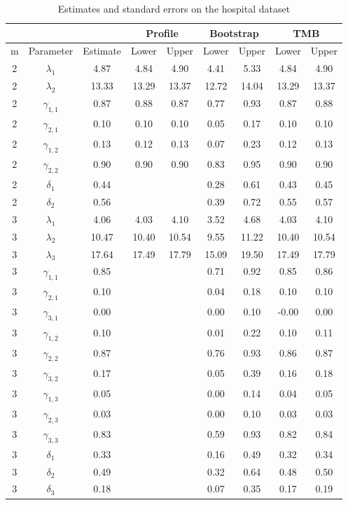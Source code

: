\documentclass[bimj,fleqn]{w-art}\usepackage[]{graphicx}\usepackage[]{color}
\theoremstyle{plain}
\theoremstyle{definition}
\begin{document}
\begin{table}[ht]
\centering
\begin{tabular}{ccccccccc}
  &&& \multicolumn{2}{c}{Profile}& \multicolumn{2}{c}{Bootstrap}& \multicolumn{2}{c}{TMB}\\ \hline
m & Parameter & Estimate & Lower & Upper & Lower & Upper & Lower & Upper \\ 
  \hline
  2 & $\lambda_{1}$ & 4.87 & 4.84 & 4.90 & 4.41 & 5.33 & 4.84 & 4.90 \\ 
    2 & $\lambda_{2}$ & 13.33 & 13.29 & 13.37 & 12.72 & 14.04 & 13.29 & 13.37 \\ 
    2 & $\gamma_{1, 1}$ & 0.87 & 0.88 & 0.87 & 0.77 & 0.93 & 0.87 & 0.88 \\ 
    2 & $\gamma_{2, 1}$ & 0.10 & 0.10 & 0.10 & 0.05 & 0.17 & 0.10 & 0.10 \\ 
    2 & $\gamma_{1, 2}$ & 0.13 & 0.12 & 0.13 & 0.07 & 0.23 & 0.12 & 0.13 \\ 
    2 & $\gamma_{2, 2}$ & 0.90 & 0.90 & 0.90 & 0.83 & 0.95 & 0.90 & 0.90 \\ 
    2 & $\delta_{1}$ & 0.44 &  &  & 0.28 & 0.61 & 0.43 & 0.45 \\ 
    2 & $\delta_{2}$ & 0.56 &  &  & 0.39 & 0.72 & 0.55 & 0.57 \\ 
    3 & $\lambda_{1}$ & 4.06 & 4.03 & 4.10 & 3.52 & 4.68 & 4.03 & 4.10 \\ 
    3 & $\lambda_{2}$ & 10.47 & 10.40 & 10.54 & 9.55 & 11.22 & 10.40 & 10.54 \\ 
    3 & $\lambda_{3}$ & 17.64 & 17.49 & 17.79 & 15.09 & 19.50 & 17.49 & 17.79 \\ 
    3 & $\gamma_{1, 1}$ & 0.85 &  &  & 0.71 & 0.92 & 0.85 & 0.86 \\ 
    3 & $\gamma_{2, 1}$ & 0.10 &  &  & 0.04 & 0.18 & 0.10 & 0.10 \\ 
    3 & $\gamma_{3, 1}$ & 0.00 &  &  & 0.00 & 0.10 & -0.00 & 0.00 \\ 
    3 & $\gamma_{1, 2}$ & 0.10 &  &  & 0.01 & 0.22 & 0.10 & 0.11 \\ 
    3 & $\gamma_{2, 2}$ & 0.87 &  &  & 0.76 & 0.93 & 0.86 & 0.87 \\ 
    3 & $\gamma_{3, 2}$ & 0.17 &  &  & 0.05 & 0.39 & 0.16 & 0.18 \\ 
    3 & $\gamma_{1, 3}$ & 0.05 &  &  & 0.00 & 0.14 & 0.04 & 0.05 \\ 
    3 & $\gamma_{2, 3}$ & 0.03 &  &  & 0.00 & 0.10 & 0.03 & 0.03 \\ 
    3 & $\gamma_{3, 3}$ & 0.83 &  &  & 0.59 & 0.93 & 0.82 & 0.84 \\ 
    3 & $\delta_{1}$ & 0.33 &  &  & 0.16 & 0.49 & 0.32 & 0.34 \\ 
    3 & $\delta_{2}$ & 0.49 &  &  & 0.32 & 0.64 & 0.48 & 0.50 \\ 
    3 & $\delta_{3}$ & 0.18 &  &  & 0.07 & 0.35 & 0.17 & 0.19 \\ 
   \hline
\end{tabular}
\caption{Estimates and standard errors on the hospital dataset} 
\label{table:hosp_estimates_std_errors}
\end{table}
\end{document}
